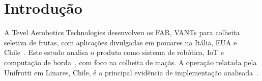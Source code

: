 \section{Introdução}

A Tevel Aerobotics Technologies desenvolveu os \ac{FAR}, \acp{VANT} para colheita seletiva de frutas, com aplicações divulgadas em pomares na Itália, EUA e Chile~\cite{tevel2026}. Este estudo analisa o produto como sistema de robótica, \ac{IoT} e computação de borda~\cite{reeuwijk2025}, com foco na colheita de maçãs. A operação relatada pela Unifrutti em Linares, Chile, é a principal evidência de implementação analisada~\cite{unifrutti2023tevel}.